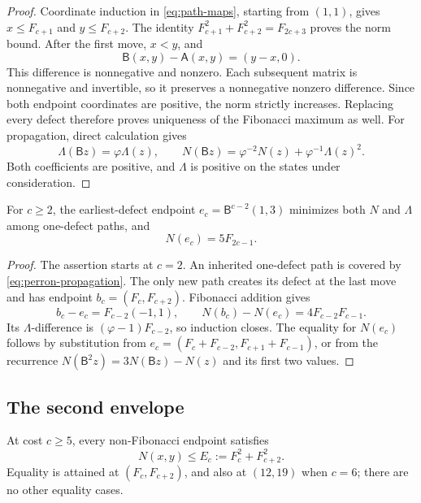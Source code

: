 \begin{proof}
Coordinate induction in \eqref{eq:path-maps}, starting from $(1,1)$,
gives $x\leqslant F_{c+1}$ and $y\leqslant F_{c+2}$.
The identity $F_{c+1}^2+F_{c+2}^2=F_{2c+3}$ proves the norm bound.
After the first move, $x<y$, and
$$
 \mathsf B(x,y)-\mathsf A(x,y)=(y-x,0).
$$
This difference is nonnegative and nonzero. Each subsequent matrix
is nonnegative and invertible, so it preserves a nonnegative nonzero
difference. Since both endpoint coordinates are positive, the norm
strictly increases. Replacing every defect therefore proves uniqueness
of the Fibonacci maximum as well.
For propagation, direct calculation gives
\begin{equation}\label{eq:perron-propagation}
 \Lambda(\mathsf Bz)=\varphi\Lambda(z),\qquad
 N(\mathsf Bz)=\varphi^{-2}N(z)+\varphi^{-1}\Lambda(z)^2.
\end{equation}
Both coefficients are positive, and $\Lambda$ is positive on the
states under consideration.
\end{proof}

\begin{lemma}\label{lem:one-defect-minimum}
For $c\geqslant2$, the earliest-defect endpoint
$e_c=\mathsf B^{c-2}(1,3)$ minimizes both $N$ and $\Lambda$ among
one-defect paths, and
\begin{equation}\label{eq:one-defect-minimum}
 N(e_c)=5F_{2c-1}.
\end{equation}
\end{lemma}

\begin{proof}
The assertion starts at $c=2$. An inherited one-defect path is covered
by \eqref{eq:perron-propagation}. The only new path creates its defect
at the last move and has endpoint $b_c=(F_c,F_{c+2})$. Fibonacci
addition gives
$$
 b_c-e_c=F_{c-2}(-1,1),\qquad
 N(b_c)-N(e_c)=4F_{c-2}F_{c-1}.
$$
Its $\Lambda$-difference is $(\varphi-1)F_{c-2}$, so induction closes.
The equality for $N(e_c)$ follows by substitution from
$e_c=(F_c+F_{c-2},F_{c+1}+F_{c-1})$, or from the recurrence
$N(\mathsf B^2z)=3N(\mathsf Bz)-N(z)$ and its first two values.
\end{proof}

\subsection{The second envelope}

\begin{lemma}\label{lem:second-envelope}
At cost $c\geqslant5$, every non-Fibonacci endpoint satisfies
\begin{equation}\label{eq:second-envelope}
 N(x,y)\leqslant E_c:=F_c^2+F_{c+2}^2.
\end{equation}
Equality is attained at $(F_c,F_{c+2})$, and also at $(12,19)$ when
$c=6$; there are no other equality cases.
\end{lemma}

